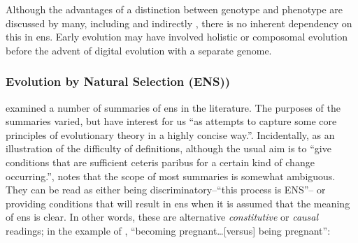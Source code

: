 Although the advantages of a distinction between genotype and phenotype are discussed by many, including \parencite[section 7.2.3]{Taylor1999} and indirectly \cite{VonNeumann1966}, there is no inherent dependency on this in \gls{ens}. Early evolution may have involved holistic or composomal evolution before the advent of digital evolution with a separate genome.




\subsubsection{Evolution by Natural Selection (ENS))}\label{ens-evolution-by-natural-selection}

\cite{Godfrey-Smith2007} examined a number of summaries of \gls{ens} in the literature. The purposes of the summaries varied, but have interest for us ``as attempts to capture some core principles of evolutionary theory in a highly concise way.''. Incidentally, as an illustration of the difficulty of definitions, although the usual aim is to ``give conditions that are sufficient ceteris paribus for a certain kind of change occurring.'', \cite{Godfrey-Smith2007} notes that the scope of most summaries is somewhat ambiguous. They can be read as either being discriminatory--``this process is ENS''-- or providing conditions that will result in \gls{ens} when it is assumed that the meaning of \gls{ens} is clear. In other words, these are alternative \emph{constitutive} or \emph{causal} readings; in the example of \cite{Godfrey-Smith2007}, ``becoming pregnant\ldots{}{[}versus{]} being pregnant'':

